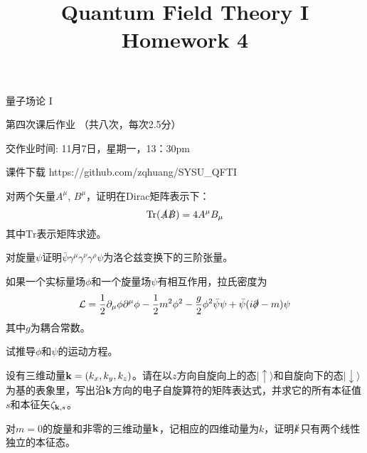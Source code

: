 \documentclass[CJK]{beamer}
\title{Quantum Field Theory I \\ Homework 4}
\author{}
\date{}
\begin{document}
\begin{frame}
 
\begin{center}
\begin{Large}
\bch
量子场论 I 

{\vskip 0.3in}

第四次课后作业 （共八次，每次2.5分）

交作业时间: 11月7日，星期一，13：30pm

\ech
\end{Large}
\end{center}

\vskip 0.2in

\bch
课件下载
\ech
https://github.com/zqhuang/SYSU\_QFTI

\end{frame}

\begin{frame}
\bch
对两个矢量$A^\mu$, $B^\mu$，证明在Dirac矩阵表示下：
$$\mathrm{Tr}(\slashed{A}\slashed{B}) = 4A^\mu B_\mu$$
其中$\mathrm{Tr}$表示矩阵求迹。
\ech
\end{frame}

\begin{frame}
\bch
对旋量$\psi$证明$\bar{\psi}\gamma^\mu\gamma^\nu\gamma^\rho\psi$为洛仑兹变换下的三阶张量。
\ech
\end{frame}

\begin{frame}
\bch
如果一个实标量场$\phi$和一个旋量场$\psi$有相互作用，拉氏密度为
$${\mathcal{L}} = \frac{1}{2}\partial_\mu\phi\partial^\mu\phi - \frac{1}{2}m^2\phi^2 - \frac{g}{2}\phi^2\bar\psi\psi + \bar\psi(i\slashed{\partial}-m)\psi$$
其中$g$为耦合常数。

试推导$\phi$和$\psi$的运动方程。
\ech
\end{frame}


\begin{frame}
\bch
设有三维动量${\mathbf{k}} = (k_x, k_y, k_z)$。请在以$z$方向自旋向上的态$|\uparrow\rangle$和自旋向下的态$|\downarrow\rangle$为基的表象里，写出沿${\mathbf{k}}$方向的电子自旋算符的矩阵表达式，并求它的所有本征值$s$和本征矢$\zeta_{{\mathbf{k}},s}$。
\ech
\end{frame}


\begin{frame}
\bch
对$m=0$的旋量和非零的三维动量${\mathbf{k}}$，记相应的四维动量为$k$，证明$\slashed{k}$只有两个线性独立的本征态。 
\ech
\end{frame}
\end{document}
